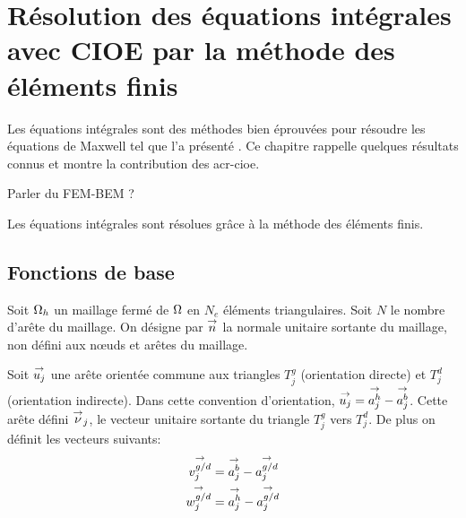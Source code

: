 \section{Résolution des équations intégrales avec CIOE par la méthode des éléments finis}

  \newcommand{\phij}{\vect{\phi_j}}
  \newcommand{\pj}{\vect{p_j}}
  \newcommand{\qj}{\vect{q_j}}
  \newcommand{\nuj}{\vect{\nu_j}}
  \newcommand{\uj}{\vect{u_j}}
    
  Les équations intégrales sont des méthodes bien éprouvées pour résoudre les équations de Maxwell tel que l'a présenté \cite{nedelec_acoustic_2001}. Ce chapitre  rappelle quelques résultats connus et montre la contribution des \gls{acr-cioe}.

  \begin{TODO} 
    Parler du FEM-BEM ?
  \end{TODO}

  Les équations intégrales sont résolues grâce à la méthode des éléments finis.

  \subsection{Fonctions de base}

    Soit \(\Omega_h\) un maillage fermé de \(\Omega\) en \(N_e\) éléments triangulaires. Soit \(N\) le nombre d'arête du maillage. On désigne par \({\overset{\rightarrow}{n}}\) la normale unitaire sortante du maillage, non défini aux nœuds et arêtes du maillage.

    Soit \(\uj\) une arête orientée commune aux triangles \(T_j^g\) (orientation directe) et \(T_j^d\) (orientation indirecte). Dans cette convention d'orientation, \(\uj = \vect{a_j^h}-\vect{a_j^b}\). Cette arête défini \({\overset{\rightarrow}{\nu}}_j\), le vecteur unitaire sortante du triangle \(T_j^g\) vers \(T_j^d\).  De plus on définit les vecteurs suivants: 
    \begin{align}
      {\overset{\rightarrow}{v_j^{g/d}}} &= {\overset{\rightarrow}{a_j^b}} - {\overset{\rightarrow}{a_j^{g/d}}} \\
      {\overset{\rightarrow}{w_j^{g/d}}} &= {\overset{\rightarrow}{a_j^h}} - {\overset{\rightarrow}{a_j^{g/d}}}
    \end{align}

    \newcommand{\ncouche}{6}
    \newcommand{\xa}{-0.2}
    \newcommand{\ya}{0.0}
    \newcommand{\xb}{3}
    \newcommand{\yb}{0.3}
    \newcommand{\xc}{0.4}
    \newcommand{\yc}{4}
    \newcommand{\xd}{4}
    \newcommand{\yd}{3.4}

